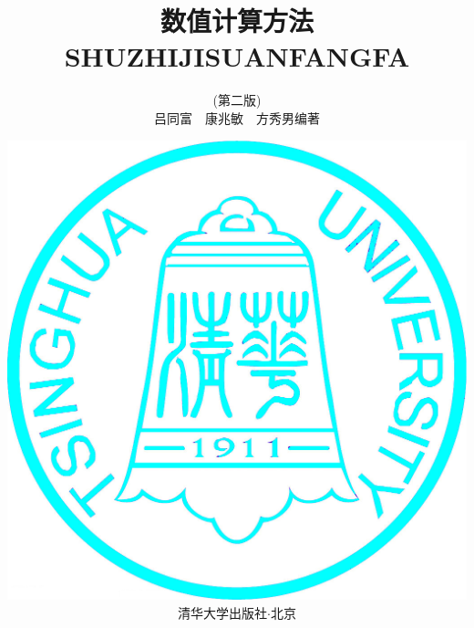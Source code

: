 
\title{\hei\vspace*{-2cm} 数值计算方法\\{\vspace*{-1.2cm} SHUZHIJISUANFANGFA}}
\author{(第二版)\\吕同富~~康兆敏~~方秀男\hspace{1em}编著}
\date{\vspace*{3cm}\centering\includegraphics[totalheight=1.5in]{fig/qinghua.jpg}\\清华大学出版社$\cdot$北京}
\maketitle
